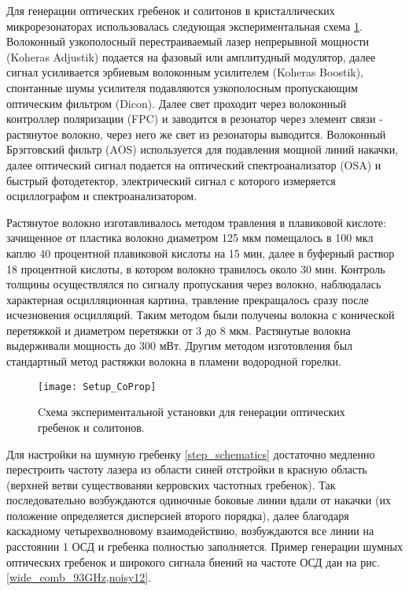 Для генерации оптических гребенок и солитонов в кристаллических микрорезонаторах использовалась следующая экспериментальная схема \ref{Setup_CoProp}. Волоконный узкополосный перестраиваемый лазер непрерывной мощности (Koheras Adjustik) подается на фазовый или амплитудный модулятор, далее сигнал усиливается эрбиевым волоконным усилителем (Koheras Boostik), спонтанные шумы усилителя подавляются узкополосным пропускающим оптическим фильтром (Dicon). Далее свет проходит через волоконный контроллер поляризации (FPC) и заводится в резонатор через элемент связи - растянутое волокно, через него же свет из резонаторы выводится. Волоконный Брэгговский фильтр (AOS) используется для подавления мощной линий накачки, далее оптический сигнал подается на оптический спектроанализатор (OSA) и быстрый фотодетектор, электрический сигнал с которого измеряется осциллографом и спектроанализатором.

Растянутое волокно изготавливалось методом травления в плавиковой кислоте: зачищенное от пластика волокно диаметром 125 мкм помещалось в 100 мкл каплю 40 процентной плавиковой кислоты на 15 мин, далее в буферный раствор 18 процентной кислоты, в котором волокно травилось около 30 мин. Контроль толщины осуществлялся по сигналу пропускания через волокно, наблюдалась характерная осцилляционная картина, травление прекращалось сразу после исчезновения осцилляций. Таким методом были получены волокна с конической перетяжкой и диаметром перетяжки от 3 до 8 мкм. Растянутые волокна выдерживали мощность до 300 мВт. Другим методом изготовления был стандартный метод растяжки волокна в пламени водородной горелки.

\begin{figure}[ht]
\centering
  \texttt{[image: Setup\_CoProp]}
  \caption{Cхема экспериментальной установки для генерации оптических гребенок и солитонов.}
  \label{Setup_CoProp}
\end{figure}

Для настройки на шумную гребенку \ref{step_schematics} достаточно медленно перестроить частоту лазера из области синей отстройки в красную область (верхней ветви существованяи керровских частотных гребенок). Так последовательно возбуждаются одиночные боковые линии вдали от накачки (их положение определяется дисперсией второго порядка), далее благодаря каскадному четырехволновому взаимодействию, возбуждаются все линии на расстоянии 1 ОСД и гребенка полностью заполняется. Пример генерации шумных оптических гребенок и широкого сигнала биений на частоте ОСД дан на рис. \ref{wide_comb_93GHz,noisy12}.

